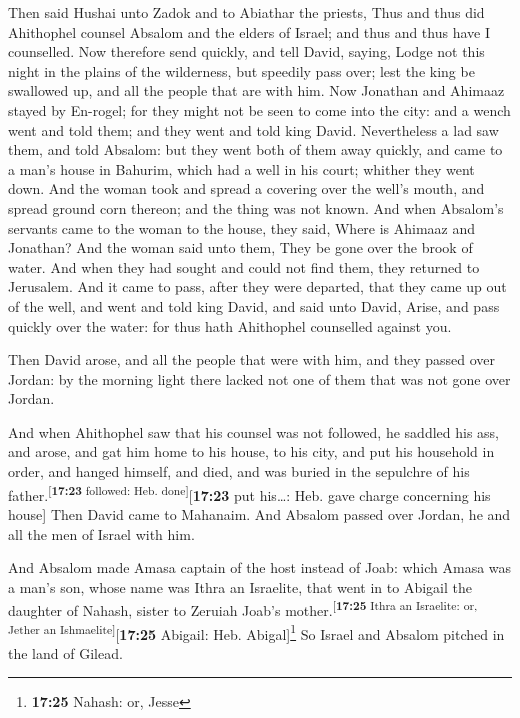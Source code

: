 Then said Hushai unto Zadok and to Abiathar the priests,
Thus and thus did Ahithophel counsel Absalom and the elders of Israel;
and thus and thus have I counselled.  Now therefore send
quickly, and tell David, saying, Lodge not this night in the plains of
the wilderness, but speedily pass over; lest the king be swallowed up,
and all the people that are with him.  Now Jonathan and
Ahimaaz stayed by En-rogel; for they might not be seen to come into the
city: and a wench went and told them; and they went and told king David.
 Nevertheless a lad saw them, and told Absalom: but they
went both of them away quickly, and came to a man's house in Bahurim,
which had a well in his court; whither they went down. 
And the woman took and spread a covering over the well's mouth, and
spread ground corn thereon; and the thing was not known. 
And when Absalom's servants came to the woman to the house, they said,
Where is Ahimaaz and Jonathan? And the woman said unto them, They be
gone over the brook of water. And when they had sought and could not
find them, they returned to Jerusalem.  And it came to
pass, after they were departed, that they came up out of the well, and
went and told king David, and said unto David, Arise, and pass quickly
over the water: for thus hath Ahithophel counselled against you.

 Then David arose, and all the people that were with him,
and they passed over Jordan: by the morning light there lacked not one
of them that was not gone over Jordan.

 And when Ahithophel saw that his counsel was not
followed, he saddled his ass, and arose, and gat him home to his house,
to his city, and put his household in order, and hanged himself, and
died, and was buried in the sepulchre of his
father.\textsuperscript{{[}\textbf{17:23} followed: Heb.
done{]}}{[}\textbf{17:23} put his\ldots: Heb. gave charge concerning his
house{]}  Then David came to Mahanaim. And Absalom passed
over Jordan, he and all the men of Israel with him.

 And Absalom made Amasa captain of the host instead of
Joab: which Amasa was a man's son, whose name was Ithra an Israelite,
that went in to Abigail the daughter of Nahash, sister to Zeruiah Joab's
mother.\textsuperscript{{[}\textbf{17:25} Ithra an Israelite: or, Jether
an Ishmaelite{]}}{[}\textbf{17:25} Abigail: Heb. Abigal{]}\footnote{\textbf{17:25}
  Nahash: or, Jesse}  So Israel and Absalom pitched in
the land of Gilead.

